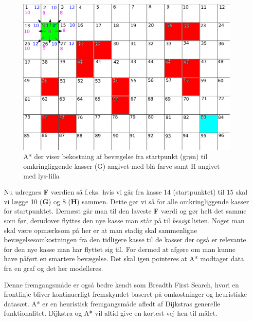 \begin{figure}[H]
\begin{center}
\includegraphics[width=1.00\textwidth]{Pictures/Teoriafsnit/Figurfiler/Grid3.png}
\end{center}
\caption{A* der viser bekostning af bevægelse fra startpunkt (grøn) til omkringliggende kasser (G) angivet med blå farve samt H angivet med lys-lilla}
\label{fig:AKvadrat2}
\end{figure}

Nu udregnes \textbf{F} værdien så f.eks. hvis vi går fra kasse 14 (startpunktet) til 15 skal vi lægge 10 (\textbf{G}) og 8 (\textbf{H}) sammen. Dette gør vi så for alle omkringliggende kasser for startpunktet. Dernæst går man til den laveste \textbf{F} værdi og gør helt det samme som før, derudover flyttes den nye kasse man står på til \textit{besøgt} listen. Noget man skal være opmærksom på her er at man stadig skal sammenligne bevægelsesomkostningen fra den tidligere kasse til de kasser der også er relevante for den nye kasse man har flyttet sig til. For dermed at afgøre om man kunne have påført en smartere bevægelse. Det skal igen pointeres at A* modtager data fra en graf og det her modelleres.

\vspace{5mm}

Denne fremgangsmåde er også bedre kendt som Breadth First Search, hvori en frontlinje bliver kontinuerligt fremskyndet baseret på omkostninger og heuristiske datasæt\cite{stanfordredblobgamesAstar}.
A* er en heuristisk fremgangsmåde afledt af Dijkstras generelle funktionalitet. Dijkstra og A* vil altid give en kortest vej hen til målet.  %

